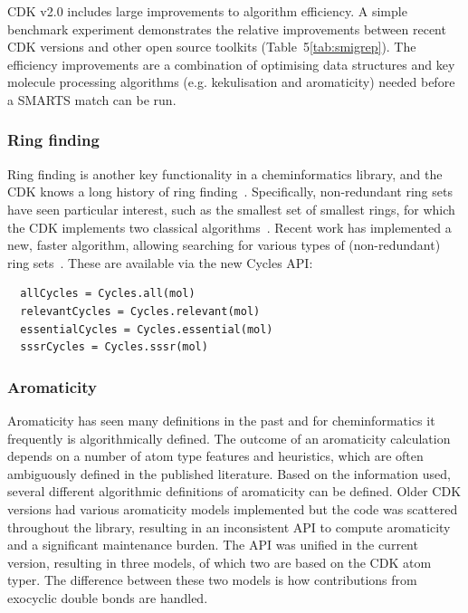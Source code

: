 \documentclass[doublespacing]{bmcart}
\def \cdkversion {v2.0}
\begin{document}
CDK \cdkversion{} includes large improvements to algorithm
efficiency. A simple benchmark experiment demonstrates the relative
improvements between recent CDK versions and other open source
toolkits (Table~5\ref{tab:smigrep}). The efficiency improvements are a
combination of optimising data structures and key molecule processing
algorithms (e.g. kekulisation and aromaticity) needed before a SMARTS
match can be run.
  


\subsubsection*{Ring finding}

Ring finding is another key functionality in a cheminformatics library, and
the CDK knows a long history of ring finding~\cite{Berger2004,May2014}. Specifically,
non-redundant ring sets have seen particular interest,
such as the smallest set of smallest rings, for which the CDK
implements two classical algorithms~\cite{Figueras1996,Berger2004}.
Recent work has implemented a new, faster algorithm, allowing
searching for various types of (non-redundant) ring
sets~\cite{May2014}. These are available via the new Cycles API:

\vspace{0.2cm}
\begin{verbatim}
  allCycles = Cycles.all(mol)
  relevantCycles = Cycles.relevant(mol)
  essentialCycles = Cycles.essential(mol)
  sssrCycles = Cycles.sssr(mol)
\end{verbatim}
\vspace{0.2cm}

\subsubsection*{Aromaticity}

Aromaticity has seen many definitions in the past and for
cheminformatics it frequently is algorithmically defined. The outcome
of an aromaticity calculation depends on a number of atom type
features and heuristics, which are often ambiguously defined in the
published literature. Based on the information used, several different
algorithmic definitions of aromaticity can be defined. Older CDK
versions had various aromaticity models implemented but the code was scattered
throughout the library, resulting in an inconsistent API
to compute aromaticity and a significant maintenance
burden.  The API was unified in the current version, resulting in three
models, of which two are based on the CDK atom typer. The difference
between these two models is how contributions from exocyclic double
bonds are handled.
\end{document}

